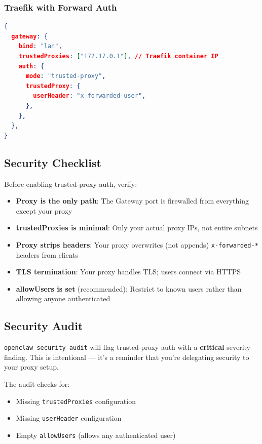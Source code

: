 \subsubsection{Traefik with Forward Auth}


\begin{lstlisting}[language=json]
{
  gateway: {
    bind: "lan",
    trustedProxies: ["172.17.0.1"], // Traefik container IP
    auth: {
      mode: "trusted-proxy",
      trustedProxy: {
        userHeader: "x-forwarded-user",
      },
    },
  },
}
\end{lstlisting}


\subsection{Security Checklist}


Before enabling trusted-proxy auth, verify:

\begin{itemize}
  \item [ ] \textbf{Proxy is the only path}: The Gateway port is firewalled from everything except your proxy
  \item [ ] \textbf{trustedProxies is minimal}: Only your actual proxy IPs, not entire subnets
  \item [ ] \textbf{Proxy strips headers}: Your proxy overwrites (not appends) \texttt{x-forwarded-*} headers from clients
  \item [ ] \textbf{TLS termination}: Your proxy handles TLS; users connect via HTTPS
  \item [ ] \textbf{allowUsers is set} (recommended): Restrict to known users rather than allowing anyone authenticated
\end{itemize}


\subsection{Security Audit}


\texttt{openclaw security audit} will flag trusted-proxy auth with a \textbf{critical} severity finding. This is intentional — it's a reminder that you're delegating security to your proxy setup.

The audit checks for:

\begin{itemize}
  \item Missing \texttt{trustedProxies} configuration
  \item Missing \texttt{userHeader} configuration
  \item Empty \texttt{allowUsers} (allows any authenticated user)
\end{itemize}


